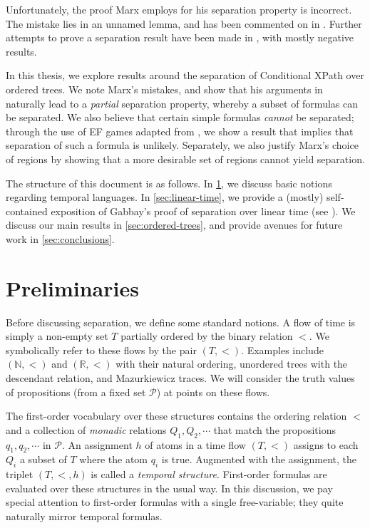 \documentclass[a4paper,UKenglish,cleveref, autoref, thm-restate, numberwithinsect]{lipics-v2021}
\begin{document}
Unfortunately, the proof Marx employs for his separation property is incorrect. The mistake lies in an unnamed lemma, and has been commented on in \cite{BeJe07, nwtl}. Further attempts to prove a separation result have been made in \cite{BeCl16}, with mostly negative results.

In this thesis, we explore results around the separation of Conditional XPath over ordered trees. We note Marx's mistakes, and show that his arguments in \cite{xpathComplete} naturally lead to a \textit{partial} separation property, whereby a subset of formulas can be separated. We also believe that certain simple formulas \textit{cannot} be separated; through the use of EF games adapted from \cite{EtWi00}, we show a result that implies that separation of such a formula is unlikely. Separately, we also justify Marx's choice of regions by showing that a more desirable set of regions cannot yield separation.

The structure of this document is as follows. In \cref{sec:preliminaries}, we discuss basic notions regarding temporal languages. In \cref{sec:linear-time}, we provide a (mostly) self-contained exposition of Gabbay's proof of separation over linear time (see \cite{DecPastImpFuture89, gabbay1994}). We discuss our main results in \cref{sec:ordered-trees}, and provide avenues for future work in \cref{sec:conclusions}.

\section{Preliminaries}
\label{sec:preliminaries}

Before discussing separation, we define some standard notions. A flow of time is simply a non-empty set $T$ partially ordered by the binary relation $<$. We symbolically refer to these flows by the pair $(T, <)$. Examples include $(\mathbb{N}, <)$ and $(\mathbb{R}, <)$ with their natural ordering, unordered trees with the descendant relation, and Mazurkiewicz traces. We will consider the truth values of propositions (from a fixed set $\mathcal{P}$) at points on these flows.

The first-order vocabulary over these structures contains the ordering relation $<$ and a collection of \textit{monadic} relations $Q_1, Q_2, \cdots$ that match the propositions $q_1, q_2, \cdots$ in $\mathcal{P}$. An assignment $h$ of atoms in a time flow $(T, <)$ assigns to each $Q_i$ a subset of $T$ where the atom $q_i$ is true. Augmented with the assignment, the triplet $(T, <, h)$ is called a \textit{temporal structure}. First-order formulas are evaluated over these structures in the usual way. In this discussion, we pay special attention to first-order formulas with a single free-variable; they quite naturally mirror temporal formulas.
\end{document}
